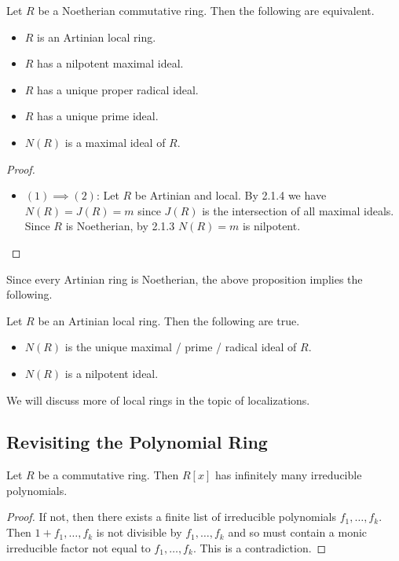 \documentclass[a4paper]{article}
\begin{document}
\begin{prp}{}{} Let $R$ be a Noetherian commutative ring. Then the following are equivalent. 
\begin{itemize}
\item $R$ is an Artinian local ring. 
\item $R$ has a nilpotent maximal ideal. 
\item $R$ has a unique proper radical ideal. 
\item $R$ has a unique prime ideal. 
\item $N(R)$ is a maximal ideal of $R$. 
\end{itemize} 
\begin{proof}\\
\begin{itemize}
\item $(1)\implies(2)$: Let $R$ be Artinian and local. By 2.1.4 we have $N(R)=J(R)=m$ since $J(R)$ is the intersection of all maximal ideals. Since $R$ is Noetherian, by 2.1.3 $N(R)=m$ is nilpotent. 
\end{itemize}
\end{proof}
\end{prp}

Since every Artinian ring is Noetherian, the above proposition implies the following. 

\begin{crl}{}{} Let $R$ be an Artinian local ring. Then the following are true. 
\begin{itemize}
\item $N(R)$ is the unique maximal / prime / radical ideal of $R$. 
\item $N(R)$ is a nilpotent ideal. 
\end{itemize}
\end{crl}

We will discuss more of local rings in the topic of localizations. 

\subsection{Revisiting the Polynomial Ring}
\begin{lmm}{}{} Let $R$ be a commutative ring. Then $R[x]$ has infinitely many irreducible polynomials. 
\begin{proof}
If not, then there exists a finite list of irreducible polynomials $f_1,\dots,f_k$. Then $1+f_1,\dots,f_k$ is not divisible by $f_1,\dots,f_k$ and so must contain a monic irreducible factor not equal to $f_1,\dots,f_k$. This is a contradiction. 
\end{proof}
\end{lmm}
\end{document}
